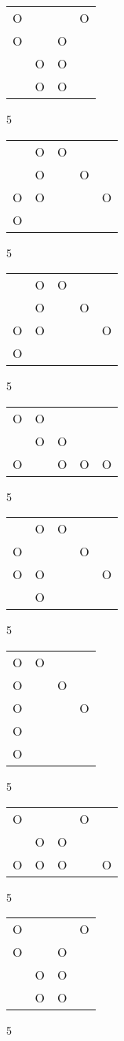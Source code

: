 \begin{tabular}{|m{0.2cm}m{0.2cm}m{0.2cm}m{0.2cm}|}\hline
O& & &O\\
O& &O& \\
 &O&O& \\
 &O&O& \\
\hline\end{tabular}5
\begin{tabular}{|m{0.2cm}m{0.2cm}m{0.2cm}m{0.2cm}m{0.2cm}|}\hline
 &O&O& & \\
 &O& &O& \\
O&O& & &O\\
O& & & & \\
\hline\end{tabular}5
\begin{tabular}{|m{0.2cm}m{0.2cm}m{0.2cm}m{0.2cm}m{0.2cm}|}\hline
 &O&O& & \\
 &O& &O& \\
O&O& & &O\\
O& & & & \\
\hline\end{tabular}5
\begin{tabular}{|m{0.2cm}m{0.2cm}m{0.2cm}m{0.2cm}m{0.2cm}|}\hline
O&O& & & \\
 &O&O& & \\
O& &O&O&O\\
\hline\end{tabular}5
\begin{tabular}{|m{0.2cm}m{0.2cm}m{0.2cm}m{0.2cm}m{0.2cm}|}\hline
 &O&O& & \\
O& & &O& \\
O&O& & &O\\
 &O& & & \\
\hline\end{tabular}5
\begin{tabular}{|m{0.2cm}m{0.2cm}m{0.2cm}m{0.2cm}|}\hline
O&O& & \\
O& &O& \\
O& & &O\\
O& & & \\
O& & & \\
\hline\end{tabular}5
\begin{tabular}{|m{0.2cm}m{0.2cm}m{0.2cm}m{0.2cm}m{0.2cm}|}\hline
O& & &O& \\
 &O&O& & \\
O&O&O& &O\\
\hline\end{tabular}5
\begin{tabular}{|m{0.2cm}m{0.2cm}m{0.2cm}m{0.2cm}|}\hline
O& & &O\\
O& &O& \\
 &O&O& \\
 &O&O& \\
\hline\end{tabular}5
